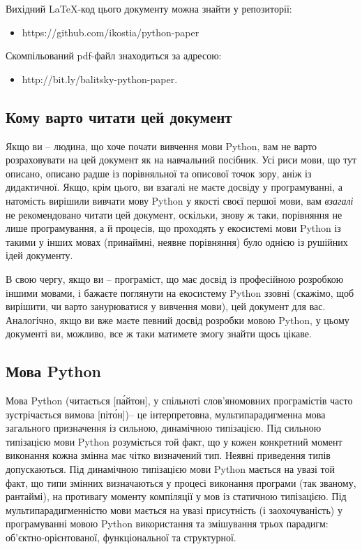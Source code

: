 \documentclass[a4paper, 12pt, onsedie]{article}
\begin{document}
    Вихідний \LaTeX-код цього документу можна знайти у репозиторії: 
    \begin{itemize} \item https://github.com/ikostia/python-paper \end{itemize}
    
    Скомпільований pdf-файл знаходиться за адресою:
    \begin{itemize} \item http://bit.ly/balitsky-python-paper. \end{itemize}

    \subsection{Кому варто читати цей документ}
    Якщо ви -- людина, що хоче почати вивчення мови Python, вам не варто розраховувати на цей документ як
    на навчальний посібник. Усі риси мови, що тут описано, описано радше із порівняльної та описової точок
    зору, аніж із дидактичної. Якщо, крім цього, ви взагалі не маєте досвіду у програмуванні, а натомість
    вирішили вивчати мову Python у якості своєї першої мови, вам \emph{взагалі} не рекомендовано читати цей
    документ, оскільки, знову ж таки, порівняння не лише програмування, а й процесів, що проходять у екосистемі
    мови Python із такими у інших мовах (принаймні, неявне порівняння) було однією із рушійних ідей документу.

    В свою чергу, якщо ви -- програміст, що має досвід із професійною розробкою іншими мовами, і бажаєте
    поглянути на екосистему Python ззовні (скажімо, щоб вирішити, чи варто занурюватися у вивчення мови),
    цей документ для вас. Аналогічно, якщо ви вже маєте певний досвід розробки мовою Python, у цьому документі
    ви, можливо, все ж таки матимете змогу знайти щось цікаве.

\subsection{Мова Python}

    Мова Python (читається [п\'{а}йтон], у спільноті слов'яномовних програмістів 
    часто зустрічається вимова [піт\'{о}н])-- 
    це інтерпретовна, мультипарадигменна мова загального призначення із сильною,
    динамічною типізацією. Під сильною типізацією мови Python розуміється той факт, що у кожен конкретний момент
    виконання кожна змінна має чітко визначений тип. Неявні приведення типів допускаються. Під динамічною типізацією
    мови Python мається на увазі той факт, що типи змінних визначаються у процесі виконання програми (так званому,
    рантаймі), на противагу моменту компіляції у мов із статичною типізацією. Під мультипарадигменністю мови мається
    на увазі присутність (і заохочуваність) у програмуванні мовою Python використання та змішування трьох парадигм:
    об'єктно-орієнтованої, функціональної та структурної.
\end{document}
